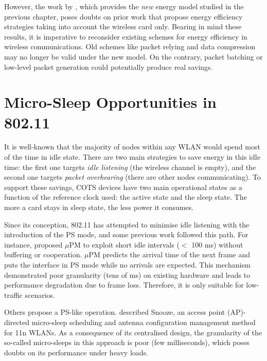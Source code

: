 \documentclass[twoside,nohyper]{tufte-book}
\begin{document}
However, the work by \citet{Serrano2014}, which provides the \emph{new} energy model studied in the previous chapter, poses doubts on prior work that propose energy efficiency strategies taking into account the wireless card only. Bearing in mind these results, it is imperative to reconsider existing schemes for energy efficiency in wireless communications. Old schemes like packet relying \citep{He2010} and data compression \citep{Baek2004, Sharma2009} may no longer be valid under the new model. On the contrary, packet batching or low-level packet generation could potentially produce real savings.

\hypertarget{micro-sleep-opportunities-in-802.11-1}{%
\section{Micro-Sleep Opportunities in 802.11}\label{micro-sleep-opportunities-in-802.11-1}}

It is well-known that the majority of nodes within any WLAN would spend most of the time in idle state. There are two main strategies to save energy in this idle time: the first one targets \emph{idle listening} (the wireless channel is empty), and the second one targets \emph{packet overhearing} (there are other nodes communicating). To support these savings, COTS devices have two main operational states as a function of the reference clock used: the active state and the sleep state. The more a card stays in sleep state, the less power it consumes.

Since its conception, 802.11 has attempted to minimise idle listening with the introduction of the PS mode, and some previous work followed this path. For instance, \citet{Liu2008} proposed \(\mu\)PM to exploit short idle intervals (\(<\) 100 ms) without buffering or cooperation. \(\mu\)PM predicts the arrival time of the next frame and puts the interface in PS mode while no arrivals are expected. This mechanism demonstrated poor granularity (tens of ms) on existing hardware and leads to performance degradation due to frame loss. Therefore, it is only suitable for low-traffic scenarios.

Others propose a PS-like operation. \citet{Jang2011} described Snooze, an access point (AP)-directed micro-sleep scheduling and antenna configuration management method for 11n WLANs. As a consequence of its centralised design, the granularity of the so-called micro-sleeps in this approach is poor (few milliseconds), which poses doubts on its performance under heavy loads.
\end{document}
